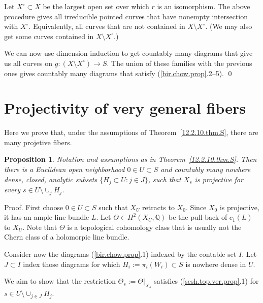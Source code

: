 \documentclass{amsart}
\newtheorem{prop}[thm]{Proposition}
\theoremstyle{definition}
\theoremstyle{remark}
\newcommand{\q}[0]{{\mathbb Q}}
\begin{document}
Let $X^\circ\subset X$ be the largest open set over which $r$ is an isomorphism. The above procedure gives all irreducible pointed curves that have  nonempty intersection with $X^\circ$.  Equivalently, all curves that are not contained in $X\setminus X^\circ$. (We may also get some curves contained in $X\setminus X^\circ$.)

We can now use  dimension induction to get countably many diagrams that give us all curves on  $g: (X\setminus X^\circ)\to S$. The union of these  families with the previous ones gives
 countably many diagrams
that satisfy (\ref{bir.chow.prop}.2--5). \qed

  






\section{Projectivity of very general fibers}

Here we prove that, under the  assumptions of Theorem~\ref{12.2.10.thm.S}, there are many projetive fibers.


\begin{prop}\label{12.2.10.vgen.prop}
  Notation and assumptions as in Theorem~\ref{12.2.10.thm.S}.
  Then there is a Euclidean    open neighborhood  $0\in U\subset S$ and
  countably many nowhere dense,  closed, analytic  subsets  $\{ H_j\subset   U: j\in J\}$,  such that $X_s$ is projective for every $s\in U\setminus \cup_j H_j$.
\end{prop}




  
Proof. First choose $0\in U\subset S$ such
 that $X_U$  retracts to $X_0$.
Since $X_0$ is projective,  it has an ample line bundle $L$.
Let  $\Theta\in H^2(X_U, \q)$ be the pull-back of
$c_1(L)$ to $X_U$.  Note that $\Theta$ is a topological cohomology class that is usually not the Chern class of a holomorpic line bundle.

Consider now the diagrams (\ref{bir.chow.prop}.1) indexed by the contable set $I$. Let $J\subset I$ index those diagrams for which  $H_i:=\pi_i(W_i)\subset  S$ is nowhere dense in $U$. 



We aim to show that 
the restriction  $\Theta_s:=\Theta|_{X_s}$ satisfies (\ref{sesh.top.ver.prop}.1) for  $s\in U\setminus \cup_{j\in J} H_j$.
\end{document}
